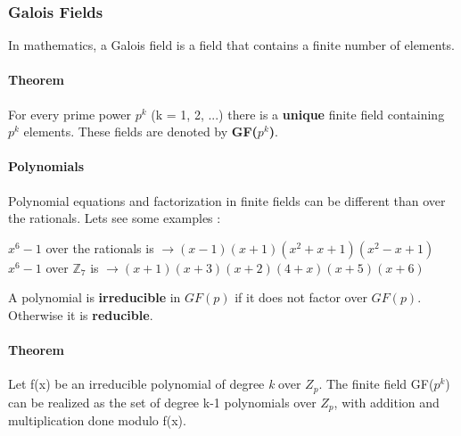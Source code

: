 \documentclass[11pt]{article}
\begin{document}
\subsubsection{Galois Fields}
In mathematics, a Galois field is a field that contains a finite number of elements.
\paragraph{Theorem} For every prime power $p^k$ (k = 1, 2, ...) there is a \textbf{unique} finite field containing $p^k$ elements. These fields are denoted by \textbf{GF($p^k$)}.
\paragraph{Polynomials} Polynomial equations and factorization in finite fields can be different than over the rationals. Lets see some examples :
\begin{center}
$x^6 - 1$ over the rationals is $\rightarrow (x-1)(x+1)(x^2 + x + 1)(x^2 - x + 1)$\\
$x^6 - 1$ over $\mathbb{Z}_7$ is $\rightarrow (x+1)(x+3)(x+2)(4+x)(x+5)(x+6)$
\end{center} 
A polynomial is \textbf{irreducible} in $GF(p)$ if it does not factor over $GF(p)$. Otherwise it is \textbf{reducible}.
\paragraph{Theorem} Let f(x) be an irreducible polynomial of degree \textit{k} over $Z_p$. The finite field GF($p^k$) can be realized as the set of degree k-1 polynomials over $Z_p$, with addition and multiplication done modulo f(x).
\end{document}
